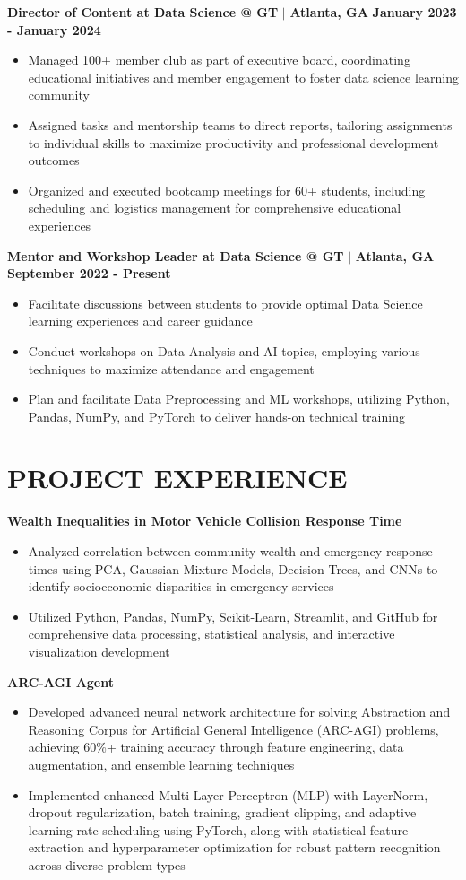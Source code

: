 \documentclass[10pt,a4paper]{article}
\newcommand{\jobtitle}[1]{\noindent\textbf{#1}}
\begin{document}
\jobtitle{Director of Content at Data Science @ GT} $|$ \textbf{Atlanta, GA} \hfill \textbf{January 2023 - January 2024}
\begin{itemize}
    \item Managed 100+ member club as part of executive board, coordinating educational initiatives and member engagement to foster data science learning community
    \item Assigned tasks and mentorship teams to direct reports, tailoring assignments to individual skills to maximize productivity and professional development outcomes
    \item Organized and executed bootcamp meetings for 60+ students, including scheduling and logistics management for comprehensive educational experiences
\end{itemize}

\jobtitle{Mentor and Workshop Leader at Data Science @ GT} $|$ \textbf{Atlanta, GA} \hfill \textbf{September 2022 - Present}
\begin{itemize}
    \item Facilitate discussions between students to provide optimal Data Science learning experiences and career guidance
    \item Conduct workshops on Data Analysis and AI topics, employing various techniques to maximize attendance and engagement
    \item Plan and facilitate Data Preprocessing and ML workshops, utilizing Python, Pandas, NumPy, and PyTorch to deliver hands-on technical training
\end{itemize}

\section*{PROJECT EXPERIENCE}
\jobtitle{Wealth Inequalities in Motor Vehicle Collision Response Time}
\begin{itemize}
    \item Analyzed correlation between community wealth and emergency response times using PCA, Gaussian Mixture Models, Decision Trees, and CNNs to identify socioeconomic disparities in emergency services
    \item Utilized Python, Pandas, NumPy, Scikit-Learn, Streamlit, and GitHub for comprehensive data processing, statistical analysis, and interactive visualization development
\end{itemize}

\jobtitle{ARC-AGI Agent}
\begin{itemize}
    \item Developed advanced neural network architecture for solving Abstraction and Reasoning Corpus for Artificial General Intelligence (ARC-AGI) problems, achieving 60\%+ training accuracy through feature engineering, data augmentation, and ensemble learning techniques
    \item Implemented enhanced Multi-Layer Perceptron (MLP) with LayerNorm, dropout regularization, batch training, gradient clipping, and adaptive learning rate scheduling using PyTorch, along with statistical feature extraction and hyperparameter optimization for robust pattern recognition across diverse problem types
\end{itemize}
\end{document}
